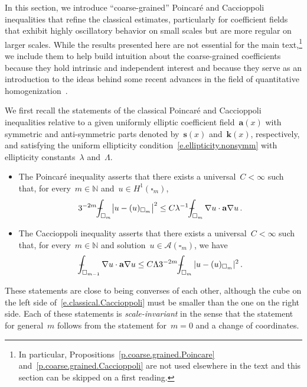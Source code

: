 \documentclass[11pt,twoside]{article} %
\let\oldsquare\square %
\renewcommand{\square}{\oldsquare}
\numberwithin{equation}{section}
\theoremstyle{definition}
\newcommand*{\N}{\ensuremath{\mathbb{N}}}
\newcommand{\s}{\mathbf{s}}
\renewcommand{\a}{\mathbf{a}}
\renewcommand{\k}{\mathbf{k}}
\newcommand{\cu}{\square}
\def\Xint#1{\mathchoice
{\XXint\displaystyle\textstyle{#1}}%
{\XXint\textstyle\scriptstyle{#1}}%
{\XXint\scriptstyle\scriptscriptstyle{#1}}%
{\XXint\scriptscriptstyle\scriptscriptstyle{#1}}%
\!\int}
\def\XXint#1#2#3{{\setbox0=\hbox{$#1{#2#3}{\int}$}
\vcenter{\hbox{$#2#3$}}\kern-.5\wd0}}
\def\fint{\Xint-}
\newcommand{\A}{\mathcal{A}}
\begin{document}
In this section, we introduce ``coarse-grained'' Poincar\'e and Caccioppoli inequalities that refine the classical estimates, particularly for coefficient fields that exhibit highly oscillatory behavior on small scales but are more regular on larger scales. While the results presented here are not essential for the main text,\footnote{In particular, Propositions~\ref{p.coarse.grained.Poincare} and~\ref{p.coarse.grained.Caccioppoli} are not used elsewhere in the text and this section can be skipped on a first reading.} we include them to help build intuition about the coarse-grained coefficients because they hold intrinsic and independent interest and because they serve as an introduction to the ideas behind some recent advances in the field of quantitative homogenization~\cite{AK.HC}.

\smallskip

We first recall the statements of the classical Poincar\'e and Caccioppoli inequalities relative to a given uniformly elliptic coefficient field~$\a(x)$ with symmetric and anti-symmetric parts denoted by~$\s(x)$ and~$\k(x)$, respectively, and satisfying the uniform ellipticity condition~\eqref{e.ellipticity.nonsymm} with ellipticity constants~$\lambda$ and~$\Lambda$. 

\begin{itemize}

\item The Poincar\'e inequality asserts that there exists a universal~$C<\infty$ such that, for every~$m\in\N$ and~$u\in H^1(\cu_m)$, 
\begin{equation}
\label{e.classical.Poincare}
3^{-2m} \fint_{\cu_m} \bigl| u - (u)_{\cu_m} \bigr|^2 
\leq
C\lambda^{-1}\fint_{\cu_m} 
\nabla u \cdot \a\nabla u \,.
\end{equation}
\item The Caccioppoli inequality asserts that there exists a universal~$C<\infty$ such that, for every~$m\in\N$ and solution~$u \in \A(\cu_m)$, we have 
\begin{equation}
\label{e.classical.Caccioppoli}
\fint_{\cu_{m-1}} 
\nabla u \cdot \a\nabla u
\leq 
C \Lambda  
3^{-2m} \fint_{\cu_m}  | u-(u)_{\cu_m}|^2 
\,.
\end{equation}
\end{itemize}
These statements are close to being converses of each other, although the cube on the left side of~\eqref{e.classical.Caccioppoli} must be smaller than the one on the right side. Each of these statements is \emph{scale-invariant} in the sense that the statement for general~$m$ follows from the statement for~$m=0$ and a change of coordinates. 
\end{document}
